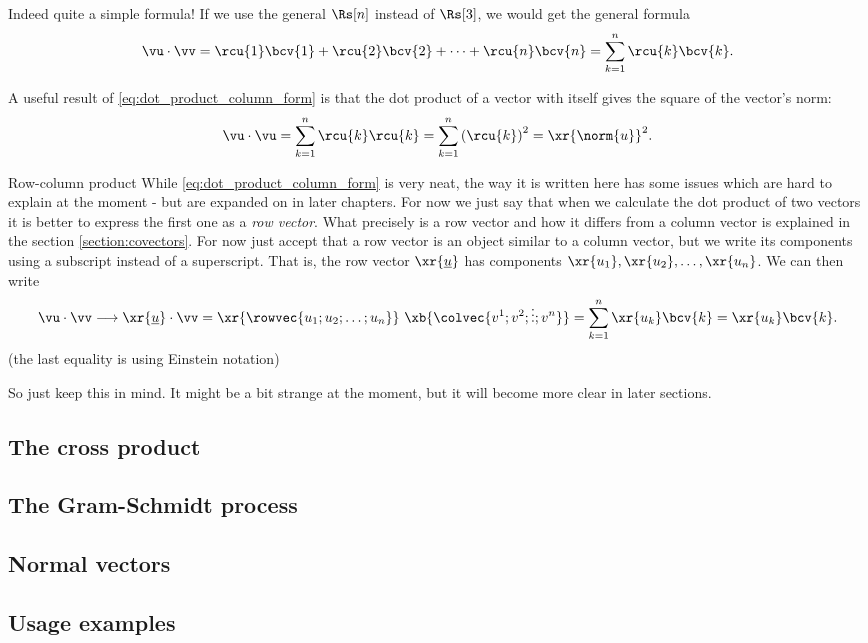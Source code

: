 Indeed quite a simple formula! If we use the general $\Rs[n]$ instead of $\Rs[3]$, we would get the general formula
\begin{equation}
  \vu\cdot\vv = \rcu{1}\bcv{1} + \rcu{2}\bcv{2} + \cdots + \rcu{n}\bcv{n} = \sum\limits_{k=1}^{n}\rcu{k}\bcv{k}.
  \label{eq:dot_product_column_form}
\end{equation}


A useful result of \autoref{eq:dot_product_column_form} is that the dot product of a vector with itself gives the square of the vector's norm:
\begin{equation}
  \vu\cdot\vu = \sum\limits_{k=1}^{n}\rcu{k}\rcu{k} = \sum\limits_{k=1}^{n}\left(\rcu{k}\right)^{2} = \xr{\norm{u}}^{2}.
  \label{eq:dot_product_sqr_norm}
\end{equation}

\begin{note}{Row-column product}{}
  While \autoref{eq:dot_product_column_form} is very neat, the way it is written here has some issues which are hard to explain at the moment - but are expanded on in later chapters. For now we just say that when we calculate the dot product of two vectors it is better to express the first one as a \emph{row vector}. What precisely is a row vector and how it differs from a column vector is explained in the section \autoref{section:covectors}. For now just accept that a row vector is an object similar to a column vector, but we write its components using a subscript instead of a superscript. That is, the row vector $\xr{\underline{u}}$ has components $\xr{u_{1}}, \xr{u_{2}}, \dots, \xr{u_{n}}$. We can then write
  \[
    \vu\cdot\vv \longrightarrow \xr{\underline{u}}\cdot\vv = \xr{\rowvec{u_{1};u_{2};\dots;u_{n}}}\ \xb{\colvec{v^{1};v^{2};\vdots;v^{n}}} = \sum\limits_{k=1}^{n}\xr{u_{k}}\bcv{k} = \xr{u_{k}}\bcv{k}.
  \]
  (the last equality is using Einstein notation)

  \vspace{1em}
  So just keep this in mind. It might be a bit strange at the moment, but it will become more clear in later sections.
\end{note}

\subsection{The cross product}
\subsection{The Gram-Schmidt process}
\subsection{Normal vectors}
\subsection{Usage examples}
